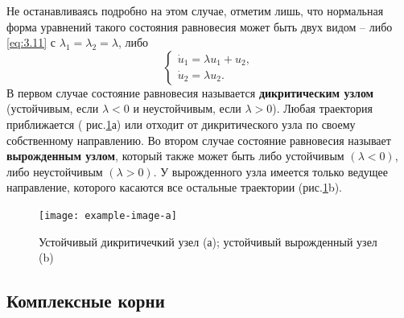  Не останавливаясь подробно на этом случае, отметим лишь, что нормальная форма уравнений такого состояния равновесия может быть двух видом -- либо \eqref{eq:3.11} с $\lambda_1=\lambda_2=\lambda$, либо 
 \begin{equation}
         \label{eq:3.24}
         \begin{cases}
                 \dot u_1 = \lambda u_1 + u_2, \\
                 \dot u_2= \lambda u_2.
         \end{cases}
 \end{equation}
 В первом случае состояние равновесия называется \textbf{ дикритическим узлом} 
 (устойчивым, если $\lambda<0$ и неустойчивым, если $\lambda>0$). Любая траектория приближается ( рис.\ref{fig:3.6}а) или отходит от дикритического узла по своему собственному направлению. Во втором случае состояние равновесия  
 называет \textbf{ вырожденным узлом}, который также может быть либо устойчивым $(\lambda<0)$, либо неустойчивым $(\lambda>0)$. У вырожденного узла имеется только ведущее направление, которого касаются все остальные траектории (рис.\ref{fig:3.6}b).

 \begin{figure}[h!]
         \centering
         \texttt{[image: example-image-a]}
         \label{fig:3.6}
         \caption{Устойчивый дикритичечкий узел (а); устойчивый вырожденный узел (b)}
 \end{figure}
 
\subsection{Комплексные корни}%
\label{sub:3.2.2}

